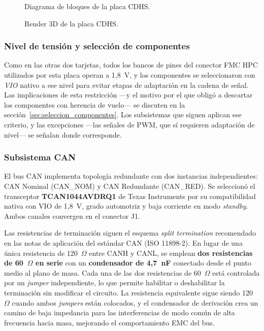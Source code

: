 \begin{figure}[H]
    \centering
    \caption{Diagrama de bloques de la placa CDHS.}
    \label{fig:cdhs_top}
\end{figure}

\begin{figure}[H]
    \centering
    \caption{Render 3D de la placa CDHS.}
    \label{fig:cdhs_3d}
\end{figure}

\subsubsection{Nivel de tensión y selección de componentes}

Como en las otras dos tarjetas, todos los bancos de pines del conector FMC HPC utilizados por esta
placa operan a 1,8~V, y los componentes se seleccionaron con \textit{VIO} nativo a ese nivel para
evitar etapas de adaptación en la cadena de señal. Las implicaciones de esta restricción ---y el
motivo por el que obligó a descartar los componentes con herencia de vuelo--- se discuten en la
sección~\ref{sec:seleccion_componentes}. Los subsistemas que siguen aplican ese criterio, y las
excepciones ---las señales de PWM, que sí requieren adaptación de nivel--- se señalan donde
corresponde.

\subsubsection{Subsistema CAN}

El bus CAN implementa topología redundante con dos instancias independientes: CAN
Nominal (CAN\_NOM) y CAN Redundante (CAN\_RED). Se seleccionó el transceptor
\textbf{TCAN1044AVDRQ1} de Texas Instruments por su compatibilidad nativa con VIO de 1,8~V,
grado automotriz y baja corriente en modo \textit{standby}. Ambos canales convergen en el
conector J1.

Las resistencias de terminación siguen el esquema \textit{split termination} recomendado en las
notas de aplicación del estándar CAN (ISO 11898-2). En lugar de una única resistencia de
120~$\Omega$ entre CANH y CANL, se emplean \textbf{dos resistencias de 60~$\Omega$ en serie} con un
\textbf{condensador de 4,7~nF} conectado desde el punto medio al plano de masa. Cada una de
las dos resistencias de 60~$\Omega$ está controlada por un \textit{jumper} independiente, lo que
permite habilitar o deshabilitar la terminación sin modificar el circuito. La resistencia
equivalente sigue siendo 120~$\Omega$ cuando ambos \textit{jumpers} están colocados, y el
condensador de derivación crea un camino de baja impedancia para las interferencias de
modo común de alta frecuencia hacia masa, mejorando el comportamiento EMC del bus.

